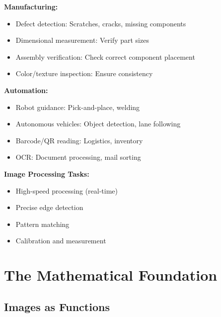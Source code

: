 \documentclass[12pt,a4paper]{article}
\begin{document}
\begin{examplebox}
\textbf{Manufacturing:}
\begin{itemize}
    \item Defect detection: Scratches, cracks, missing components
    \item Dimensional measurement: Verify part sizes
    \item Assembly verification: Check correct component placement
    \item Color/texture inspection: Ensure consistency
\end{itemize}

\textbf{Automation:}
\begin{itemize}
    \item Robot guidance: Pick-and-place, welding
    \item Autonomous vehicles: Object detection, lane following
    \item Barcode/QR reading: Logistics, inventory
    \item OCR: Document processing, mail sorting
\end{itemize}

\textbf{Image Processing Tasks:}
\begin{itemize}
    \item High-speed processing (real-time)
    \item Precise edge detection
    \item Pattern matching
    \item Calibration and measurement
\end{itemize}
\end{examplebox}

\section{The Mathematical Foundation}

\subsection{Images as Functions}
\end{document}
